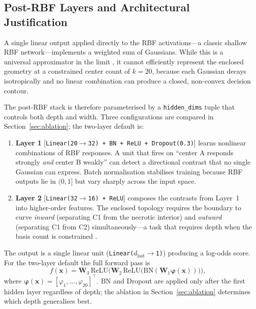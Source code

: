 \documentclass[conference]{IEEEtran}
\begin{document}
\subsection{Post-RBF Layers and Architectural Justification}
A single linear output applied directly to the RBF activations---a
classic shallow RBF network---implements a weighted sum of Gaussians.
While this is a universal approximator in the limit \cite{park1991universal},
it cannot efficiently represent the enclosed geometry at a constrained
center count of $k{=}20$, because each Gaussian decays isotropically and
no linear combination can produce a closed, non-convex decision contour.

The post-RBF stack is therefore parameterised by a \texttt{hidden\_dims}
tuple that controls both depth and width.  Three configurations are compared
in Section~\ref{sec:ablation}; the two-layer default is:
\begin{enumerate}
  \item \textbf{Layer 1} [\texttt{Linear(20$\to$32) + BN + ReLU + Dropout(0.3)}]
        learns nonlinear combinations of RBF responses.
        A unit that fires on ``center A responds strongly \emph{and} center B weakly''
        can detect a directional contrast that no single Gaussian can express.
        Batch normalisation stabilises training because RBF outputs lie in
        $(0,1]$ but vary sharply across the input space.
  \item \textbf{Layer 2} [\texttt{Linear(32$\to$16) + ReLU}]
        composes the contrasts from Layer~1 into higher-order features.
        The enclosed topology requires the boundary to curve
        \emph{inward} (separating C1 from the necrotic interior) and
        \emph{outward} (separating C1 from C2) simultaneously---a task
        that requires depth when the basis count is constrained
        \cite{cybenko1989approximation}.
\end{enumerate}
The output is a single linear unit (\texttt{Linear($d_{\text{last}}$$\to$1)})
producing a log-odds score.
For the two-layer default the full forward pass is
\[
  f(\mathbf{x}) = \mathbf{W}_3\,\mathrm{ReLU}\!\bigl(\mathbf{W}_2\,
  \mathrm{ReLU}\!\bigl(\mathrm{BN}(\mathbf{W}_1\boldsymbol{\varphi}(\mathbf{x}))\bigr)\bigr),
\]
where $\boldsymbol{\varphi}(\mathbf{x}) = [\varphi_1,\ldots,\varphi_{20}]^\top$.
BN and Dropout are applied only after the first hidden layer regardless of
depth; the ablation in Section~\ref{sec:ablation} determines which depth
generalises best.

\end{document}
